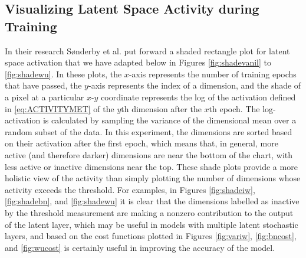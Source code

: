\documentclass{article} %
\numberwithin{figure}{section}
\begin{document}
\subsection{Visualizing Latent Space Activity during Training}
In their research S{\o}nderby et al. \cite{Sonderby2016} put forward a shaded rectangle plot for latent space activation that we have adapted below in Figures \ref{fig:shadevanil} to \ref{fig:shadewu}. In these plots, the $x$-axis represents the number of training epochs that have passed, the $y$-axis represents the index of a dimension, and the shade of a pixel at a particular $x$-$y$ coordinate represents the log of the activation defined in \ref{eq:ACTIVITYMET} of the $y$th dimension after the $x$th epoch. The log-activation is calculated by sampling the variance of the dimensional mean over a random subset of the data. In this experiment, the dimensions are sorted based on their activation after the first epoch, which means that, in general, more active (and therefore darker) dimensions are near the bottom of the chart, with less active or inactive dimensions near the top. These shade plots provide a more holistic view of the activity than simply plotting the number of dimensions whose activity exceeds the threshold. For examples, in Figures \ref{fig:shadeiw}, \ref{fig:shadebn}, and \ref{fig:shadewu} it is clear that the dimensions labelled as inactive by the threshold measurement are making a nonzero contribution to the output of the latent layer, which may be useful in models with multiple latent stochastic layers, and based on the cost functions plotted in Figures \ref{fig:variw}, \ref{fig:bncost}, and \ref{fig:wucost} is certainly useful in improving the accuracy of the model.
\end{document}
